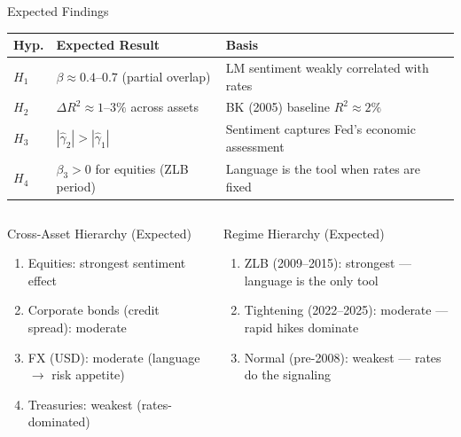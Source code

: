 \documentclass[aspectratio=169, 11pt]{beamer}
\begin{document}
\begin{frame}{Expected Findings}
  \centering
  \footnotesize
  \begin{tabularx}{\textwidth}{l X l}
    \toprule
    \textbf{Hyp.} & \textbf{Expected Result} & \textbf{Basis} \\
    \midrule
    $H_1$ & $\beta \approx 0.4$--$0.7$ (partial overlap) & LM sentiment weakly correlated with rates \\
    $H_2$ & $\Delta R^2 \approx 1$--$3\%$ across assets & BK (2005) baseline $R^2 \approx 2\%$ \\
    $H_3$ & $|\hat{\gamma}_2| > |\hat{\gamma}_1|$ & Sentiment captures Fed's economic assessment \\
    $H_4$ & $\beta_3 > 0$ for equities (ZLB period) & Language is the tool when rates are fixed \\
    \bottomrule
  \end{tabularx}

  \vspace{0.5em}
  \begin{columns}[T]
    \begin{ablock}{Cross-Asset Hierarchy (Expected)}
      \footnotesize
      \begin{enumerate}
        \item Equities: \alert{strongest} sentiment effect
        \item Corporate bonds (credit spread): moderate
        \item FX (USD): moderate (language $\to$ risk appetite)
        \item Treasuries: weakest (rates-dominated)
      \end{enumerate}
    \end{ablock}

    \begin{aalertblock}{Regime Hierarchy (Expected)}
      \footnotesize
      \begin{enumerate}
        \item ZLB (2009--2015): \alert{strongest} — language is the only tool
        \item Tightening (2022--2025): moderate — rapid hikes dominate
        \item Normal (pre-2008): weakest — rates do the signaling
      \end{enumerate}
    \end{aalertblock}
  \end{columns}
\end{frame}
\end{document}
